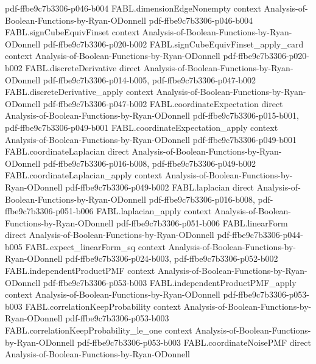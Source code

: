 \begin{theorem}
  {pdf-ffbe9c7b3306-p046-b004}
\proofstep
  {FABL.dimensionEdgeNonempty}
  {context}
  {Analysis-of-Boolean-Functions-by-Ryan-ODonnell}
  {pdf-ffbe9c7b3306-p046-b004}
\proofstep
  {FABL.signCubeEquivFinset}
  {context}
  {Analysis-of-Boolean-Functions-by-Ryan-ODonnell}
  {pdf-ffbe9c7b3306-p020-b002}
\proofstep
  {FABL.signCubeEquivFinset_apply_card}
  {context}
  {Analysis-of-Boolean-Functions-by-Ryan-ODonnell}
  {pdf-ffbe9c7b3306-p020-b002}
\proofstep
  {FABL.discreteDerivative}
  {direct}
  {Analysis-of-Boolean-Functions-by-Ryan-ODonnell}
  {pdf-ffbe9c7b3306-p014-b005,
    pdf-ffbe9c7b3306-p047-b002}
\proofstep
  {FABL.discreteDerivative_apply}
  {context}
  {Analysis-of-Boolean-Functions-by-Ryan-ODonnell}
  {pdf-ffbe9c7b3306-p047-b002}
\proofstep
  {FABL.coordinateExpectation}
  {direct}
  {Analysis-of-Boolean-Functions-by-Ryan-ODonnell}
  {pdf-ffbe9c7b3306-p015-b001,
    pdf-ffbe9c7b3306-p049-b001}
\proofstep
  {FABL.coordinateExpectation_apply}
  {context}
  {Analysis-of-Boolean-Functions-by-Ryan-ODonnell}
  {pdf-ffbe9c7b3306-p049-b001}
\proofstep
  {FABL.coordinateLaplacian}
  {direct}
  {Analysis-of-Boolean-Functions-by-Ryan-ODonnell}
  {pdf-ffbe9c7b3306-p016-b008,
    pdf-ffbe9c7b3306-p049-b002}
\proofstep
  {FABL.coordinateLaplacian_apply}
  {context}
  {Analysis-of-Boolean-Functions-by-Ryan-ODonnell}
  {pdf-ffbe9c7b3306-p049-b002}
\proofstep
  {FABL.laplacian}
  {direct}
  {Analysis-of-Boolean-Functions-by-Ryan-ODonnell}
  {pdf-ffbe9c7b3306-p016-b008,
    pdf-ffbe9c7b3306-p051-b006}
\proofstep
  {FABL.laplacian_apply}
  {context}
  {Analysis-of-Boolean-Functions-by-Ryan-ODonnell}
  {pdf-ffbe9c7b3306-p051-b006}
\proofstep
  {FABL.linearForm}
  {direct}
  {Analysis-of-Boolean-Functions-by-Ryan-ODonnell}
  {pdf-ffbe9c7b3306-p044-b005}
\proofstep
  {FABL.expect_linearForm_sq}
  {context}
  {Analysis-of-Boolean-Functions-by-Ryan-ODonnell}
  {pdf-ffbe9c7b3306-p024-b003,
    pdf-ffbe9c7b3306-p052-b002}
\proofstep
  {FABL.independentProductPMF}
  {context}
  {Analysis-of-Boolean-Functions-by-Ryan-ODonnell}
  {pdf-ffbe9c7b3306-p053-b003}
\proofstep
  {FABL.independentProductPMF_apply}
  {context}
  {Analysis-of-Boolean-Functions-by-Ryan-ODonnell}
  {pdf-ffbe9c7b3306-p053-b003}
\proofstep
  {FABL.correlationKeepProbability}
  {context}
  {Analysis-of-Boolean-Functions-by-Ryan-ODonnell}
  {pdf-ffbe9c7b3306-p053-b003}
\proofstep
  {FABL.correlationKeepProbability_le_one}
  {context}
  {Analysis-of-Boolean-Functions-by-Ryan-ODonnell}
  {pdf-ffbe9c7b3306-p053-b003}
\proofstep
  {FABL.coordinateNoisePMF}
  {direct}
  {Analysis-of-Boolean-Functions-by-Ryan-ODonnell}

\end{theorem}

